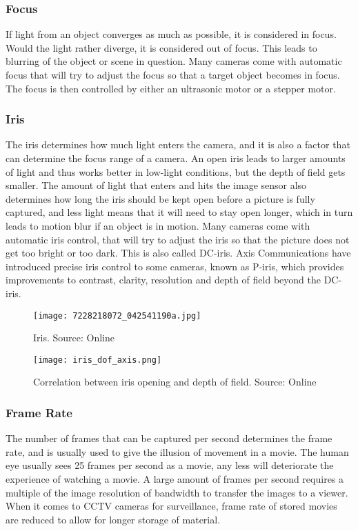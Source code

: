 \subsubsection{Focus}
If light from an object converges as much as possible, it is considered in focus. Would the light rather diverge, it is considered out of focus. This leads to blurring of the object or scene in question.
Many cameras come with automatic focus that will try to adjust the focus so that a target object becomes in focus. The focus is then controlled by either an ultrasonic motor or a stepper motor.

\subsubsection{Iris}
The iris determines how much light enters the camera, and it is also a factor that can determine the focus range of a camera. An open iris leads to larger amounts of light and thus works better in low-light conditions, but the depth of field gets smaller.
The amount of light that enters and hits the image sensor also determines how long the iris should be kept open before a picture is fully captured, and less light means that it will need to stay open longer, which in turn leads to motion blur if an object is in motion.
Many cameras come with automatic iris control, that will try to adjust the iris so that the picture does not get too bright or too dark. This is also called DC-iris.
Axis Communications have introduced precise iris control to some cameras, known as P-iris, which provides improvements to contrast, clarity, resolution and depth of field beyond the DC-iris.

\begin{figure}[ht]
    \centering
    \texttt{[image: 7228218072\_042541190a.jpg]}
    \caption{Iris. Source: Online \citet{iris15}}
    \label{fig:cfs_simple_new}
\end{figure}
\FloatBarrier

\begin{figure}[ht]
    \centering
    \texttt{[image: iris\_dof\_axis.png]}
    \caption{Correlation between iris opening and depth of field. Source: Online \citet{axispiris15}}
    \label{fig:cfs_simple_new}
\end{figure}
\FloatBarrier

\subsubsection{Frame Rate}
The number of frames that can be captured per second determines the frame rate, and is usually used to give the illusion of movement in a movie. The human eye usually sees 25 frames per second as a movie, any less will deteriorate the experience of watching a movie.
A large amount of frames per second requires a multiple of the image resolution of bandwidth to transfer the images to a viewer.
When it comes to CCTV cameras for surveillance, frame rate of stored movies are reduced to allow for longer storage of material. 

